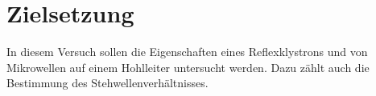 \section{Zielsetzung}
\label{sec:Zielsetzung}

In diesem Versuch sollen die Eigenschaften eines Reflexklystrons und von Mikrowellen auf einem Hohlleiter untersucht werden. 
Dazu zählt auch die Bestimmung des Stehwellenverhältnisses.
